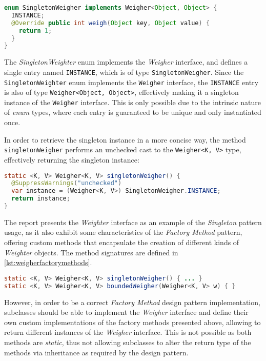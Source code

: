 \begin{lstlisting}[language=Java, caption={\texttt{SingletonWeigher} enum definition}, captionpos=b, label={lst:singletonweigher}]
enum SingletonWeigher implements Weigher<Object, Object> {
  INSTANCE;
  @Override public int weigh(Object key, Object value) {
    return 1;
  }
}
\end{lstlisting}

\noindent The \textit{SingletonWeighter} enum implements the \textit{Weigher} interface, and defines a single entry named \texttt{INSTANCE}, which is of type \texttt{SingletonWeigher}. Since the \texttt{SingletonWeighter} enum implements the \texttt{Weigher} interface, the \texttt{INSTANCE} entry is also of type \texttt{Weigher<Object, Object>}, effectively making it a singleton instance of the \texttt{Weigher} interface. This is only possible due to the intrinsic nature of \textit{enum} types, where each entry is guaranteed to be unique and only instantiated once.

In order to retrieve the singleton instance in a more concise way, the method \texttt{singletonWeigher} performs an unchecked cast to the \texttt{Weigher<K, V>} type, effectively returning the singleton instance:

\begin{lstlisting}[language=Java, caption={SingletonWeigher shorthand method to return the singleton instance using an unchecked cast}, captionpos=b, label={lst:singletonweigher}]
static <K, V> Weigher<K, V> singletonWeigher() {
  @SuppressWarnings("unchecked")
  var instance = (Weigher<K, V>) SingletonWeigher.INSTANCE;
  return instance;
}
\end{lstlisting}

\noindent The report presents the \textit{Weighter} interface as an example of the \textit{Singleton} pattern usage, as it also exhibit some characteristics of the \textit{Factory Method} pattern, offering custom methods that encapsulate the creation of different kinds of \textit{Weighter} objects. The method signatures are defined in \autoref{lst:weigherfactorymethods}.

\begin{lstlisting}[language=Java, caption={Weigher interface factory methods}, captionpos=b, label={lst:weigherfactorymethods}]
static <K, V> Weigher<K, V> singletonWeigher() { ... }
static <K, V> Weigher<K, V> boundedWeigher(Weigher<K, V> w) { }
\end{lstlisting}

\noindent However, in order to be a correct \textit{Factory Method} design pattern implementation, subclasses should be able to implement the \textit{Weigher} interface and define their own custom implementations of the factory methods presented above, allowing to return different instances of the \textit{Weigher} interface. This is not possible as both methods are \textit{static}, thus not allowing subclasses to alter the return type of the methods via inheritance as required by the design pattern.

